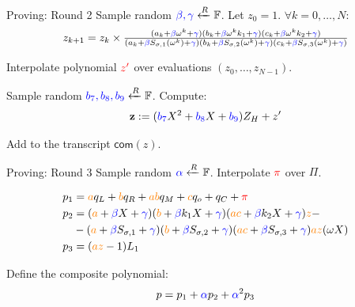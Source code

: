 \documentclass{zkdl-presentation-template}
\begin{document}
    \begin{frame} {Proving: Round 2}
        Sample random $\textcolor{blue}{\beta, \gamma} \xleftarrow{R} \mathbb{F}$. Let $z_0 = 1$. 
        $\forall k = 0, \dots, N:$\\
        \begin{equation*}
            z_{k+1} = z_{k} \times \textstyle\frac{(a_k + \textcolor{blue}{\beta} \omega^{k} + \textcolor{blue}{\gamma}) (b_k + \textcolor{blue}{\beta} \omega^{k}k_1 + \textcolor{blue}{\gamma}) (c_k + \textcolor{blue}{\beta} \omega^{k}k_2 + \textcolor{blue}{\gamma})}{(a_k + \textcolor{blue}{\beta} S_{\sigma,1}(\omega^{k}) + \textcolor{blue}{\gamma}) (b_k + \textcolor{blue}{\beta} S_{\sigma,2}(\omega^{k}) + \textcolor{blue}{\gamma}) (c_k + \textcolor{blue}{\beta} S_{\sigma,3}(\omega^{k}) + \textcolor{blue}{\gamma})}
        \end{equation*}

        Interpolate polynomial $\textcolor{red}{z'}$ over evaluations $(z_0, \dots, z_{N-1})$.

        Sample random $\textcolor{blue}{b_7, b_8, b_9} \xleftarrow{R} \mathbb{F}$. Compute:
        \begin{equation*}
            \textbf{z} := (\textcolor{blue}{b_7} X^2 + \textcolor{blue}{b_8} X + \textcolor{blue}{b_9})Z_H + z'
        \end{equation*}
        
        Add to the transcript $\mathsf{com}(z)$.
    \end{frame}

    \begin{frame} {Proving: Round 3}
        Sample random $\textcolor{blue}{\alpha} \xleftarrow{R} \mathbb{F}$.
        Interpolate $\textcolor{red}{\pi}$ over $\Pi$.
    
        \begin{align*}
        p_1 &= \textcolor{orange}{a}q_L + \textcolor{orange}{b}q_R + \textcolor{orange}{ab}q_M + \textcolor{orange}{c}q_o + q_C + \textcolor{red}{\pi} \\
        p_2 &= (\textcolor{orange}{a} + \textcolor{blue}{\beta} X + \textcolor{blue}{\gamma})(\textcolor{orange}{b} + \textcolor{blue}{\beta} k_1 X + \textcolor{blue}{\gamma})(\textcolor{orange}{ac} + \textcolor{blue}{\beta} k_2 X + \textcolor{blue}{\gamma})\textcolor{orange}{z} - \\
            &- (\textcolor{orange}{a} + \textcolor{blue}{\beta} S_{\sigma,1} + \textcolor{blue}{\gamma})(\textcolor{orange}{b} + \textcolor{blue}{\beta} S_{\sigma,2} + \textcolor{blue}{\gamma})(\textcolor{orange}{ac} + \textcolor{blue}{\beta} S_{\sigma,3} + \textcolor{blue}{\gamma})\textcolor{orange}{az}(\omega X) \\
        p_3 &= (\textcolor{orange}{az} - 1)L_1
        \end{align*}

        Define the composite polynomial:
        \begin{equation*}
            p = p_1 + \textcolor{blue}{\alpha} p_2 + \textcolor{blue}{\alpha}^2 p_3
        \end{equation*}
    \end{frame}
\end{document}
